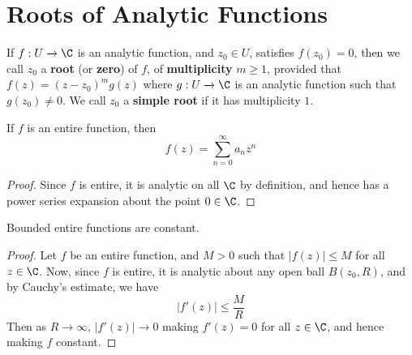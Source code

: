 \section{Roots of Analytic Functions}

\begin{definition}
    If $f:U \xrightarrow{} \C$ is an analytic function, and $z_0 \in U$,
    satisfies $f(z_0)=0$, then we call $z_0$ a \textbf{root} (or \textbf{zero})
    of $f$, of \textbf{multiplicity} $m \geq 1$, provided that
    $f(z)=(z-z_0)^mg(z)$ where $g:U \xrightarrow{} \C$ is an analytic function
    such that $g(z_0) \neq 0$. We call $z_0$ a \textbf{simple root} if it has
    multiplicity $1$.
\end{definition}

\begin{lemma}\label{4.4.1}
    If $f$ is an entire function, then
    \begin{equation*}
        f(z)=\sum_{n=0}^\infty{a_nz^n}
    \end{equation*}
\end{lemma}
\begin{proof}
    Since $f$ is entire, it is analytic on all  $\C$ by definition, and hence
    has a power series expansion about the point $0 \in \C$.
\end{proof}

\begin{theorem}\label{4.4.2}
    Bounded entire functions are constant.
\end{theorem}
\begin{proof}
    Let $f$ be an entire function, and  $M>0$ such that  $|f(z)| \leq M$ for all
    $z \in \C$. Now, since  $f$ is entire, it is analytic about any open ball
    $B(z_0,R)$, and by Cauchy's estimate, we have
    \begin{equation*}
        |f'(z)| \leq \frac{M}{R}
    \end{equation*}
    Then as $R \xrightarrow{} \infty$, $|f'(z)| \xrightarrow{} 0$ making
    $f'(z)=0$ for all $z \in \C$, and hence making $f$ constant.
\end{proof}

